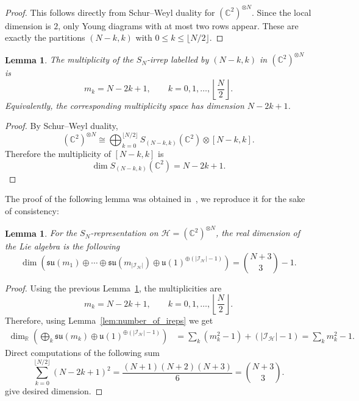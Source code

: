 \documentclass[11pt,letterpaper]{article}
\newcounter{alg}
\theoremstyle{plain}
\theoremstyle{plain}
\theoremstyle{plain}
\theoremstyle{plain}
\theoremstyle{plain}
\theoremstyle{plain}
\newcommand{\C}{\mathbb{C}}
\theoremstyle{plain}
\newtheorem{smlemma}[smtheorem]{Lemma}
\theoremstyle{definition}
\theoremstyle{plain}
\begin{document}
\begin{proof}
This follows directly from Schur--Weyl duality for
\((\mathbb C^2)^{\otimes N}\). Since the local dimension is \(2\), only Young
diagrams with at most two rows appear. These are exactly the partitions
\((N-k,k)\) with \(0\leq k\leq \lfloor N/2\rfloor\).
\end{proof}

\begin{smlemma}\label{lem:multipl_dim}
The multiplicity of the \(S_N\)-irrep labelled by \((N-k,k)\) in
\((\mathbb C^2)^{\otimes N}\) is
\[
    m_k=N-2k+1,
    \qquad
    k=0,1,\ldots,\left\lfloor\frac N2\right\rfloor .
\]
Equivalently, the corresponding multiplicity space has dimension \(N-2k+1\).
\end{smlemma}

\begin{proof}
By Schur--Weyl duality,
\[
    (\mathbb C^2)^{\otimes N}
    \cong
    \bigoplus_{k=0}^{\lfloor N/2\rfloor}
    S_{(N-k,k)}(\C^2)
    \otimes
    [N-k, k].
\]
Therefore the multiplicity of \([N-k, k]\) is
\[
    \dim S_{(N-k,k)}(\C^2)=N-2k+1 .
\]
\end{proof}

The proof of the following lemma was obtained in~\cite{Albertini2018}, we reproduce it for the sake of consistency:
\begin{smlemma}\label{lem:Sn_full_dimension}
For the \(S_N\)-representation on \(\mathcal H=(\mathbb C^2)^{\otimes N}\), the real dimension of the Lie algebra is the following
\[
    \dim\left(\mathfrak{su}(m_1)\oplus\cdots\oplus
    \mathfrak{su}(m_{|\mathcal I_{\mathcal H}|})
    \oplus
    \mathfrak{u}(1)^{\oplus(|\mathcal I_{\mathcal H}|-1)}\right)=\binom{N+3}{3}-1.
\]
\end{smlemma}

\begin{proof}
Using the previous Lemma~\ref{lem:multipl_dim}, the multiplicities are
\[
    m_k=N-2k+1,
    \qquad
    k=0,1,\ldots,\left\lfloor\frac N2\right\rfloor .
\]
Therefore, using Lemma~\ref{lem:number_of_ireps} we get
\[
\begin{aligned}
    \dim_{\mathbb R}
    \left(
    \bigoplus_k \mathfrak{su}(m_k)
    \oplus
    \mathfrak{u}(1)^{\oplus(|\mathcal I_{\mathcal H}|-1)}
    \right)
    &=
    \sum_k (m_k^2-1)
    +
    \left(|\mathcal I_{\mathcal H}|-1\right)
    =
    \sum_k m_k^2-1 .
\end{aligned}
\]
Direct computations of the following sum
\[
    \sum_{k=0}^{\lfloor N/2\rfloor}(N-2k+1)^2
    =
    \frac{(N+1)(N+2)(N+3)}{6}
    =
    \binom{N+3}{3}.
\]
give desired dimension.
\end{proof}
\end{document}
